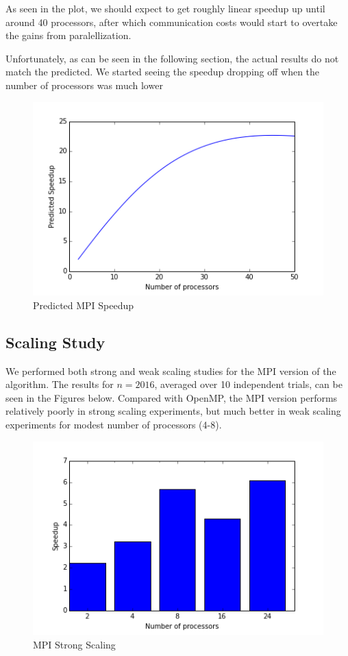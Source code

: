 \documentclass[11pt]{article}
\begin{document}
As seen in the plot, we should expect to get roughly linear speedup up until around 
40 processors, after which communication costs would start to overtake the gains from
paralellization.

Unfortunately, as can be seen in the following section,
the actual results do not match the predicted.  We started seeing the speedup
dropping off when the number of processors was much lower

\begin{figure}
\caption{Predicted MPI Speedup}
\label{mpi-predicted-speedup}
\includegraphics{../results/predicted_speedup.png}
\end{figure}

\subsection*{Scaling Study}

We performed both strong and weak scaling studies for the MPI version of the algorithm.
The results for $n=2016$, averaged over 10 independent trials, can be seen in the Figures
below.  Compared with OpenMP, the MPI version performs relatively poorly in strong scaling 
experiments, but much better in weak scaling experiments for modest number of processors (4-8).

\begin{figure}
\caption{MPI Strong Scaling}
\label{mpi-strong-scaling}
\includegraphics{../results/mpi_strong.png}
\end{figure}
\end{document}
